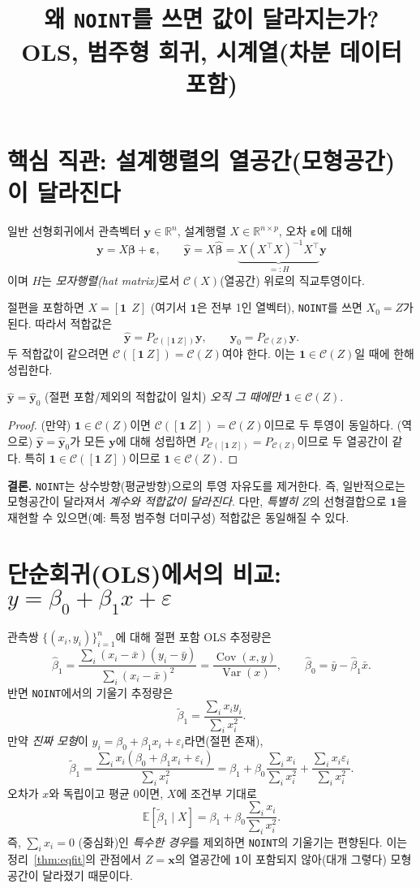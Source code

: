 \documentclass[12pt]{article}
\title{왜 \texttt{NOINT}를 쓰면 값이 달라지는가?\\
\large OLS, 범주형 회귀, 시계열(차분 데이터 포함)}
\author{}
\date{}
\begin{document}
\maketitle

\section{핵심 직관: 설계행렬의 열공간(모형공간)이 달라진다}
일반 선형회귀에서 관측벡터 $\bm y \in \mathbb{R}^n$, 설계행렬 $X \in \mathbb{R}^{n\times p}$, 오차 $\bm\varepsilon$에 대해
\[
\bm y = X\bm\beta + \bm\varepsilon,\qquad \hat{\bm y}=X\hat{\bm\beta} = \underbrace{X(X^\top X)^{-1}X^\top}_{=:H}\bm y
\]
이며 $H$는 \emph{모자행렬(hat matrix)}로서 $\mathcal{C}(X)$(열공간) 위로의 직교투영이다.
\medskip

절편을 포함하면 $X=[\bm 1\ \ Z]$ (여기서 $\bm 1$은 전부 1인 열벡터), \texttt{NOINT}를 쓰면 $X_0=Z$가 된다.
따라서 적합값은
\[
\hat{\bm y} = P_{\mathcal{C}([\bm 1\ Z])}\bm y,\qquad
\hat{\bm y}_0 = P_{\mathcal{C}(Z)}\bm y.
\]
두 적합값이 같으려면 $\mathcal{C}([\bm 1\ Z])=\mathcal{C}(Z)$여야 한다. 이는 $\bm 1\in\mathcal{C}(Z)$일 때에 한해 성립한다.

$\hat{\bm y}=\hat{\bm y}_0$ (절편 포함/제외의 적합값이 일치) \emph{오직 그 때에만} $\bm 1\in\mathcal{C}(Z)$.


\begin{proof}
(만약) $\bm 1\in\mathcal{C}(Z)$이면 $\mathcal{C}([\bm 1\ Z])=\mathcal{C}(Z)$이므로 두 투영이 동일하다.
(역으로) $\hat{\bm y}=\hat{\bm y}_0$가 모든 $\bm y$에 대해 성립하면 $P_{\mathcal{C}([\bm 1\ Z])}=P_{\mathcal{C}(Z)}$이므로 두 열공간이 같다. 특히 $\bm 1\in\mathcal{C}([\bm 1\ Z])$이므로 $\bm 1\in\mathcal{C}(Z)$.
\end{proof}

\noindent
\textbf{결론.} \texttt{NOINT}는 상수방향(평균방향)으로의 투영 자유도를 제거한다. 즉, 일반적으로는 모형공간이 달라져서 \emph{계수와 적합값이 달라진다}. 다만, \emph{특별히} $Z$의 선형결합으로 $\bm 1$을 재현할 수 있으면(예: 특정 범주형 더미구성) 적합값은 동일해질 수 있다.

\section{단순회귀(OLS)에서의 비교: $y=\beta_0+\beta_1 x+\varepsilon$}
관측쌍 $\{(x_i,y_i)\}_{i=1}^n$에 대해 절편 포함 OLS 추정량은
\[
\hat\beta_1=\frac{\sum_i (x_i-\bar x)(y_i-\bar y)}{\sum_i (x_i-\bar x)^2}
=\frac{\operatorname{Cov}(x,y)}{\operatorname{Var}(x)},\qquad
\hat\beta_0=\bar y-\hat\beta_1\bar x.
\]
반면 \texttt{NOINT}에서의 기울기 추정량은
\[
\tilde\beta_1=\frac{\sum_i x_i y_i}{\sum_i x_i^2}.
\]
만약 \emph{진짜 모형}이 $y_i=\beta_0+\beta_1 x_i+\varepsilon_i$라면(절편 존재),
\[
\tilde\beta_1=\frac{\sum_i x_i(\beta_0+\beta_1 x_i+\varepsilon_i)}{\sum_i x_i^2}
=\beta_1+\beta_0\frac{\sum_i x_i}{\sum_i x_i^2}+\frac{\sum_i x_i\varepsilon_i}{\sum_i x_i^2}.
\]
오차가 $x$와 독립이고 평균 0이면, $X$에 조건부 기대로
\[
\mathbb{E}[\tilde\beta_1\mid X]=\beta_1+\beta_0\frac{\sum_i x_i}{\sum_i x_i^2}.
\]
즉, $\sum_i x_i=0$ (중심화)인 \emph{특수한 경우}를 제외하면 \texttt{NOINT}의 기울기는 편향된다.
이는 정리~\ref{thm:eqfit}의 관점에서 $Z=\bm x$의 열공간에 $\bm 1$이 포함되지 않아(대개 그렿다) 모형공간이 달라졌기 때문이다.
\medskip
\end{document}
